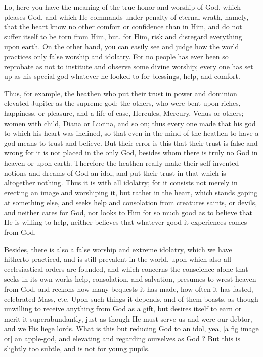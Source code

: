 Lo, here you have the meaning of the true honor and worship of God,
which pleases God, and which He commands under penalty of eternal
wrath, namely, that the heart know no other comfort or confidence than
in Him, and do not suffer itself to be torn from Him, but, for Him,
risk and disregard everything upon earth. On the other hand, you can
easily see and judge how the world practices only false worship and
idolatry. For no people has ever been so reprobate as not to institute
and observe some divine worship; every one has set up as his special
god whatever he looked to for blessings, help, and comfort.

Thus, for example, the heathen who put their trust in power and
dominion elevated Jupiter as the supreme god; the others, who were bent
upon riches, happiness, or pleasure, and a life of ease, Hercules,
Mercury, Venus or others; women with child, Diana or Lucina, and so on;
thus every one made that his god to which his heart was inclined, so
that even in the mind of the heathen to have a god means to trust and
believe. But their error is this that their trust is false and wrong
for it is not placed in the only God, besides whom there is truly no
God in heaven or upon earth. Therefore the heathen really make their
self-invented notions and dreams of God an idol, and put their trust in
that which is altogether nothing. Thus it is with all idolatry; for it
consists not merely in erecting an image and worshiping it, but rather
in the heart, which stands gaping at something else, and seeks help and
consolation from creatures saints, or devils, and neither cares for
God, nor looks to Him for so much good as to believe that He is willing
to help, neither believes that whatever good it experiences comes from
God.

Besides, there is also a false worship and extreme idolatry, which we
have hitherto practiced, and is still prevalent in the world, upon
which also all ecclesiastical orders are founded, and which concerns
the conscience alone that seeks in its own works help, consolation, and
salvation, presumes to wrest heaven from God, and reckons how many
bequests it has made, how often it has fasted, celebrated Mass, etc.
Upon such things it depends, and of them boasts, as though unwilling to
receive anything from God as a gift, but desires itself to earn or
merit it superabundantly, just as though He must serve us and were our
debtor, and we His liege lords. What is this but reducing God to an
idol, yea, [a fig image or] an apple-god, and elevating and regarding
ourselves as God ? But this is slightly too subtle, and is not for
young pupils.

